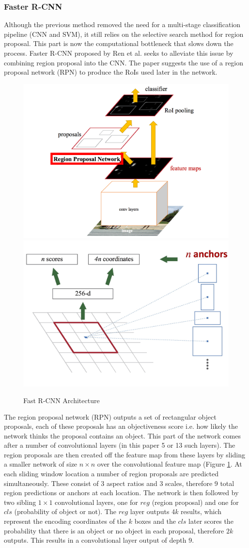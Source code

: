 \documentclass[a4paper,11pt,notitlepage]{article}
\begin{document}
\subsubsection{Faster R-CNN} \label{Faster_rcnn}
Although the previous method \cite{DBLP:journals/corr/Girshick15} removed the need for a multi-stage classification pipeline (CNN and SVM), it still relies on the selective search \cite{Uijlings2013} method for region proposal. This part is now the computational bottleneck that slows down the process. Faster R-CNN proposed by Ren et al. \cite{DBLP:journals/corr/RenHG015} seeks to alleviate this issue by combining region proposal into the CNN. The paper suggests the use of a region proposal network (RPN) to produce the RoIs used later in the network. 

\noindent \begin{figure}[h!]
\includegraphics[width = 0.5\hsize]{./figures/faster.png}
\includegraphics[width = 0.5\hsize]{./figures/rpn_faster.jpg}
\caption{Fast R-CNN Architecture \cite{DBLP:journals/corr/Girshick15}}
\label{Faster_rnn_fig}
\end{figure}

The region proposal network (RPN) outputs a set of rectangular object proposals, each of these proposals has an objectiveness score i.e. how likely the network thinks the proposal contains an object. This part of the network comes after a number of convolutional layers (in this paper 5 or 13 such layers). The region proposals are then created off the feature map from these layers by sliding a smaller network of size $n \times n$ over the convolutional feature map (Figure \ref{Faster_rnn_fig}. At each sliding window location a number of region proposals are predicted simultaneously. These consist of 3 aspect ratios and 3 scales, therefore 9 total region predictions or anchors at each location. The network is then followed by two sibling $1 \times 1$ convolutional layers, one for $reg$ (region proposal) and one for $cls$ (probability of object or not). The $reg$ layer outputs 4$k$ results, which represent the encoding coordinates of the $k$ boxes and the $cls$ later scores the probability that there is an object or no object in each proposal, therefore $2k$ outputs. This results in a convolutional layer output of depth 9.
\end{document}
